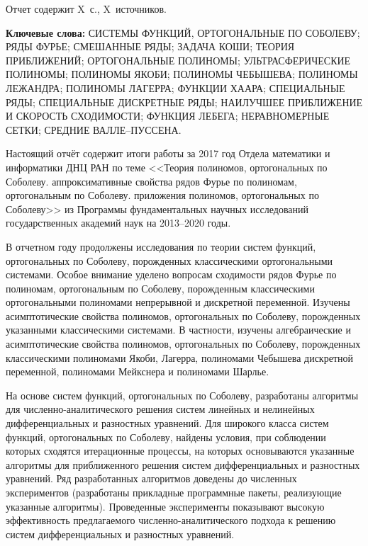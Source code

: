 \Referat %

Отчет содержит X~с., X~источников.

 \bigskip
 \textbf{ Ключевые
  слова:}
  СИСТЕМЫ ФУНКЦИЙ, ОРТОГОНАЛЬНЫЕ ПО СОБОЛЕВУ; РЯДЫ ФУРЬЕ; СМЕШАННЫЕ РЯДЫ; ЗАДАЧА КОШИ;
  ТЕОРИЯ ПРИБЛИЖЕНИЙ; ОРТОГОНАЛЬНЫЕ ПОЛИНОМЫ; УЛЬТРАСФЕРИЧЕСКИЕ ПОЛИНОМЫ; ПОЛИНОМЫ ЯКОБИ; ПОЛИНОМЫ ЧЕБЫШЕВА; ПОЛИНОМЫ ЛЕЖАНДРА; ПОЛИНОМЫ ЛАГЕРРА; ФУНКЦИИ ХААРА; СПЕЦИАЛЬНЫЕ РЯДЫ; СПЕЦИАЛЬНЫЕ ДИСКРЕТНЫЕ РЯДЫ; НАИЛУЧШЕЕ ПРИБЛИЖЕНИЕ И СКОРОСТЬ СХОДИМОСТИ; ФУНКЦИЯ ЛЕБЕГА; НЕРАВНОМЕРНЫЕ СЕТКИ; СРЕДНИЕ ВАЛЛЕ--ПУССЕНА.

 \bigskip

Настоящий отчёт содержит итоги работы за 2017 год Отдела математики и информатики ДНЦ РАН по теме
<<Теория полиномов, ортогональных по Соболеву. аппроксимативные свойства рядов Фурье по полиномам, ортогональным по Соболеву. приложения полиномов,  ортогональных по Соболеву>>
из Программы фундаментальных научных исследований государственных академий наук на 2013–2020 годы.



В отчетном году продолжены исследования по теории систем функций, ортогональных по Соболеву, порожденных классическими ортогональными системами.
Особое внимание уделено вопросам сходимости рядов Фурье по полиномам, ортогональным по Соболеву, порожденным классическими ортогональными полиномами непрерывной и дискретной переменной.
Изучены асимптотические свойства полиномов, ортогональных по Соболеву, порожденных указанными классическими системами. В частности, изучены алгебраические и асимптотические свойства полиномов, ортогональных по Соболеву, порожденных классическими полиномами Якоби, Лагерра, полиномами Чебышева дискретной переменной, полиномами Мейкснера и полиномами Шарлье.

На основе систем функций, ортогональных по Соболеву, разработаны алгоритмы для численно-аналитического решения систем линейных и нелинейных дифференциальных и разностных уравнений. Для широкого класса систем функций, ортогональных по Соболеву, найдены условия, при соблюдении которых сходятся итерационные процессы, на которых основываются указанные алгоритмы для приближенного решения систем дифференциальных и разностных уравнений.
Ряд разработанных алгоритмов доведены до численных экспериментов (разработаны прикладные программные пакеты, реализующие указанные алгоритмы).
Проведенные эксперименты показывают высокую эффективность предлагаемого численно-аналитического подхода к решению систем дифференциальных и разностных уравнений.


